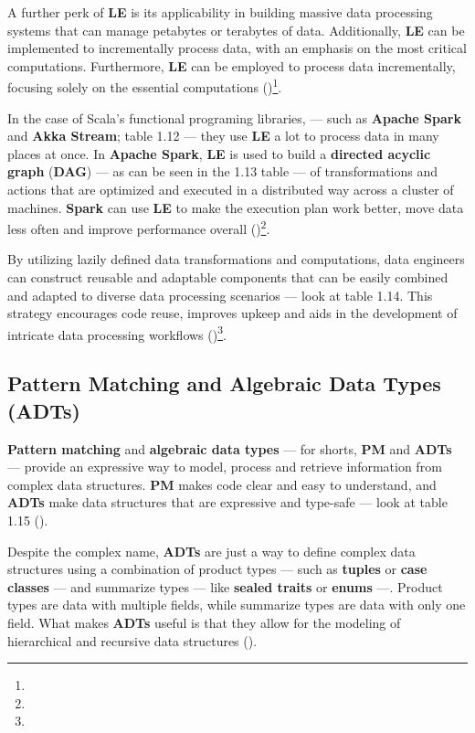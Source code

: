 

A further perk of \textbf{LE} is its applicability in building massive data processing systems that can manage petabytes or terabytes of data. Additionally, \textbf{LE} can be implemented to incrementally process data, with an emphasis on the most critical computations. Furthermore, \textbf{LE} can be employed to process data incrementally, focusing solely on the essential computations (\cite{chenE3ElasticExecution2011})\footnote[14]{}.

In the case of Scala's functional programing libraries, — such as \textbf{Apache Spark} and \textbf{Akka Stream}; table 1.12 — they use \textbf{LE} a lot to process data in many places at once. In \textbf{Apache Spark}, \textbf{LE} is used to build a \textbf{directed acyclic graph} (\textbf{DAG}) — as can be seen in the 1.13 table — of transformations and actions that are optimized and executed in a distributed way across a cluster of machines. \textbf{Spark} can use \textbf{LE} to make the execution plan work better, move data less often and improve performance overall (\cite{michael.etal_2023})\footnote[11]{}.



By utilizing lazily defined data transformations and computations, data engineers can construct reusable and adaptable components that can be easily combined and adapted to diverse data processing scenarios — look at table 1.14. This strategy encourages code reuse, improves upkeep and aids in the development of intricate data processing workflows (\cite{michael.etal_2023})\footnote[14]{}.



\subsection{Pattern Matching and Algebraic Data Types (ADTs)}

\textbf{Pattern matching} and \textbf{algebraic data types} — for shorts,  \textbf{PM} and \textbf{ADTs} — provide an expressive way to model, process and retrieve information from complex data structures. \textbf{PM} makes code clear and easy to understand, and \textbf{ADTs} make data structures that are expressive and type-safe — look at table 1.15 (\cite{michael.etal_2023})\footnotemark[11].

Despite the complex name, \textbf{ADTs} are just a way to define complex data structures using a combination of product types — such as \textbf{tuples} or \textbf{case classes} — and summarize types — like \textbf{sealed traits} or \textbf{enums} —. Product types are data with multiple fields, while summarize types are data with only one field. What makes \textbf{ADTs} useful is that they allow for the modeling of hierarchical and recursive data structures (\cite{michael.etal_2023})\footnotemark[11].

